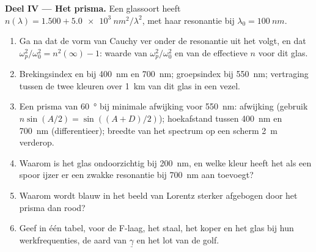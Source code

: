 \begin{problem}
\medskip
\noindent\textbf{Deel IV --- Het prisma.}
Een glassoort heeft $n(\lambda) = 1.500 + \qty{5.0e3}{nm^2}/\lambda^2$, met
haar resonantie bij $\lambda_0 = \qty{100}{nm}$.
\begin{enumerate}[resume]
  \item Ga na dat de vorm van Cauchy ver onder de resonantie uit het  volgt, en dat $\omega_p^2/\omega_0^2 = n^2(\infty) - 1$:
        waarde van $\omega_p^2/\omega_0^2$ en van de effectieve $n$ voor dit
        glas.
  \item Brekingsindex en  bij \qty{400}{nm} en \qty{700}{nm};
        groepsindex bij \qty{550}{nm}; vertraging tussen de twee kleuren
        over \qty{1}{km} van dit glas in een vezel.
  \item Een prisma van \qty{60}{\degree} bij minimale afwijking voor
        \qty{550}{nm}: afwijking (gebruik $n\sin(A/2) = \sin((A + D)/2)$);
        hoekafstand tussen \qty{400}{nm} en \qty{700}{nm} (differentieer);
        breedte van het spectrum op een scherm \qty{2}{m} verderop.
  \item Waarom is het glas ondoorzichtig bij \qty{200}{nm}, en welke kleur
        heeft het als een spoor ijzer er een zwakke resonantie bij
        \qty{700}{nm} aan toevoegt?
  \item Waarom wordt blauw in het beeld van Lorentz sterker afgebogen door
        het prisma dan rood?
  \item Geef in één tabel, voor de F-laag, het staal, het koper en het glas
        bij hun werkfrequenties, de aard van $\underline\gamma$ en het lot
        van de golf.
\end{enumerate}
\end{problem}
